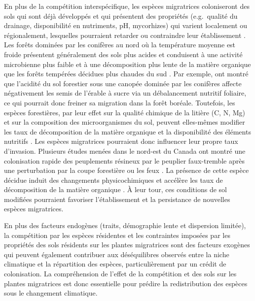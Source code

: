 En plus de la compétition interspécifique, les espèces migratrices
coloniseront des sols qui sont déjà développés et qui présentent des
propriétés (e.g.~qualité du drainage, disponibilité en nutriments, pH,
mycorhizes) qui varient localement ou régionalement, lesquelles
pourraient retarder ou contraindre leur établissement
\citep{goldblum_deciduous_2010, lafleur_response_2010, brown_non-climatic_2014}.
Les forêts dominées par les conifères au nord où la température moyenne
est froide présentent généralement des sols plus acides et conduisent à
une activité microbienne plus faible et à une décomposition plus lente
de la matière organique que les forêts tempérées décidues plus chaudes
du sud \citep{goldblum_deciduous_2010}. Par exemple,
\citet{collin_conifer_2017} ont montré que l'acidité du sol forestier
sous une canopée dominée par les conifères affecte négativement les
semis de l'érable à sucre via un débalancement nutritif foliaire, ce qui
pourrait donc freiner sa migration dans la forêt boréale. Toutefois, les
espèces forestières, par leur effet sur la qualité chimique de la
litière (C, N, Mg) et sur la composition des microorganismes du sol,
peuvent elles-mêmes modifier les taux de décomposition de la matière
organique et la disponibilité des éléments nutritifs
\citep{laganiere_how_2010}. Les espèces migratrices pourraient donc
influencer leur propre taux d'invasion. Plusieurs études menées dans le
nord-est du Canada ont montré une colonisation rapide des peuplements
résineux par le peuplier faux-tremble après une perturbation par la
coupe forestière ou les feux
\citep{chen_wildfire_2009, laquerre_augmentation_2009}. La présence de
cette espèce décidue induit des changements physicochimiques et accélère
les taux de décomposition de la matière organique
\citep{legare_influence_2005, laganiere_how_2010}. À leur tour, ces
conditions de sol modifiées pourraient favoriser l'établissement et la
persistance de nouvelles espèces migratrices.

En plus des facteurs endogènes (traits, démographie lente et dispersion
limitée), la compétition par les espèces résidentes et les contraintes
imposées par les propriétés des sols résidents sur les plantes
migratrices sont des facteurs exogènes qui peuvent également contribuer
aux déséquilibres observés entre la niche climatique et la répartition
des espèces, particulièrement par un crédit de colonisation. La
compréhension de l'effet de la compétition et des sols sur les plantes
migratrices est donc essentielle pour prédire la redistribution des
espèces sous le changement climatique.

